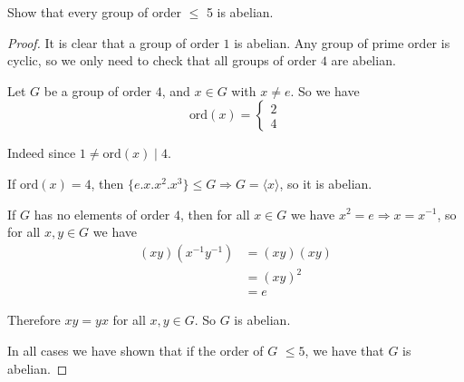 


    \begin{exercise}
        Show that every group of order $\leq$ 5 is abelian.

        \begin{proof}
            It is clear that a group of order $1$ is abelian. Any group of prime order is cyclic, so we only need to check that all groups of order $4$ are abelian.

            Let $G$ be a group of order $4$, and $x\in G$ with $x\neq e$. So we have \[\text{ord}(x) = \begin{cases}
                2\\
                4
            \end{cases}\]

            Indeed since $1\neq \text{ord}(x)\mid 4$.

            If $\text{ord}(x) = 4$, then $\{e.x.x^2.x^3\} \leq G \Rightarrow G = \langle x \rangle$, so it is abelian. 

            If $G$ has no elements of order $4$, then for all $x\in G$ we have $x^2 = e \Rightarrow x = x^{-1}$, so for all $x,y\in G$ we have\begin{align*}
                (xy)(x^{-1}y^{-1}) &= (xy)(xy)\\
                                   &= {(xy)}^2\\
                                   &= e
            \end{align*}

            Therefore $xy = yx$ for all $x,y\in G$. So $G$ is abelian.

            In all cases we have shown that if the order of $G$ $\leq 5$, we have that $G$ is abelian. 
        \end{proof}
    \end{exercise}

